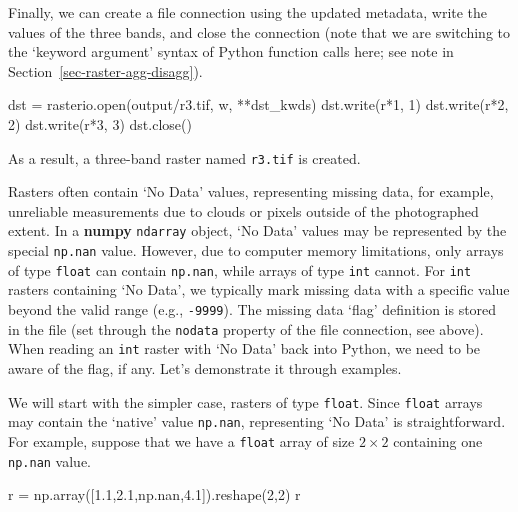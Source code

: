 \documentclass[
  letterpaper,
]{krantz}
\newenvironment{Shaded}{\begin{snugshade}}{\end{snugshade}}
\newcommand{\BuiltInTok}[1]{\textcolor[rgb]{0.00,0.23,0.31}{#1}}
\newcommand{\DecValTok}[1]{\textcolor[rgb]{0.68,0.00,0.00}{#1}}
\newcommand{\FloatTok}[1]{\textcolor[rgb]{0.68,0.00,0.00}{#1}}
\newcommand{\NormalTok}[1]{\textcolor[rgb]{0.00,0.23,0.31}{#1}}
\newcommand{\OperatorTok}[1]{\textcolor[rgb]{0.37,0.37,0.37}{#1}}
\newcommand{\StringTok}[1]{\textcolor[rgb]{0.13,0.47,0.30}{#1}}
\begin{document}
Finally, we can create a file connection using the updated metadata,
write the values of the three bands, and close the connection (note that
we are switching to the `keyword argument' syntax of Python function
calls here; see note in Section~\ref{sec-raster-agg-disagg}).

\begin{Shaded}
\begin{Highlighting}[]
\NormalTok{dst }\OperatorTok{=}\NormalTok{ rasterio.}\BuiltInTok{open}\NormalTok{(}\StringTok{\textquotesingle{}output/r3.tif\textquotesingle{}}\NormalTok{, }\StringTok{\textquotesingle{}w\textquotesingle{}}\NormalTok{, }\OperatorTok{**}\NormalTok{dst\_kwds)}
\NormalTok{dst.write(r}\OperatorTok{*}\DecValTok{1}\NormalTok{, }\DecValTok{1}\NormalTok{)}
\NormalTok{dst.write(r}\OperatorTok{*}\DecValTok{2}\NormalTok{, }\DecValTok{2}\NormalTok{)}
\NormalTok{dst.write(r}\OperatorTok{*}\DecValTok{3}\NormalTok{, }\DecValTok{3}\NormalTok{)}
\NormalTok{dst.close()}
\end{Highlighting}
\end{Shaded}

As a result, a three-band raster named \texttt{r3.tif} is created.

Rasters often contain `No Data' values, representing missing data, for
example, unreliable measurements due to clouds or pixels outside of the
photographed extent. In a \textbf{numpy} \texttt{ndarray} object, `No
Data' values may be represented by the special \texttt{np.nan} value.
However, due to computer memory limitations, only arrays of type
\texttt{float} can contain \texttt{np.nan}, while arrays of type
\texttt{int} cannot. For \texttt{int} rasters containing `No Data', we
typically mark missing data with a specific value beyond the valid range
(e.g., \texttt{-9999}). The missing data `flag' definition is stored in
the file (set through the \texttt{nodata} property of the file
connection, see above). When reading an \texttt{int} raster with `No
Data' back into Python, we need to be aware of the flag, if any. Let's
demonstrate it through examples.

We will start with the simpler case, rasters of type \texttt{float}.
Since \texttt{float} arrays may contain the `native' value
\texttt{np.nan}, representing `No Data' is straightforward. For example,
suppose that we have a \texttt{float} array of size \(2 \times 2\)
containing one \texttt{np.nan} value.

\begin{Shaded}
\begin{Highlighting}[]
\NormalTok{r }\OperatorTok{=}\NormalTok{ np.array([}\FloatTok{1.1}\NormalTok{,}\FloatTok{2.1}\NormalTok{,np.nan,}\FloatTok{4.1}\NormalTok{]).reshape(}\DecValTok{2}\NormalTok{,}\DecValTok{2}\NormalTok{)}
\NormalTok{r}
\end{Highlighting}
\end{Shaded}
\end{document}
